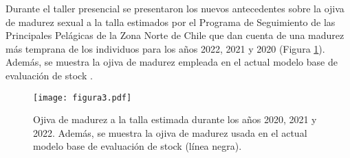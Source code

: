 Durante el taller presencial se presentaron los nuevos antecedentes sobre la ojiva de madurez sexual a la talla estimados por el Programa de Seguimiento de las Principales Pelágicas de la Zona Norte de Chile \citep{Hernandez2023} que dan cuenta de una madurez más temprana de los individuos para los años 2022, 2021 y 2020 (Figura \ref{fig:figura3}). Además, se muestra la ojiva de madurez empleada en el actual modelo base de evaluación de stock \citep{martinez2009}. 

\begin{figure}[H]
    \centering
    \texttt{[image: figura3.pdf]}
    \caption{Ojiva de madurez a la talla estimada durante los años 2020, 2021 y 2022. Además, se muestra la ojiva de madurez usada en el actual modelo base de evaluación de stock (línea negra). }
    \label{fig:figura3}
\end{figure}